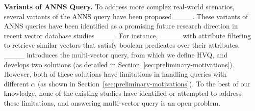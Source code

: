 
\noindent\textbf{Variants of ANNS Query.} To address more complex real-world scenarios, several variants of the ANNS query have been proposed____. These variants of ANNS queries have been identified as a promising future research direction in recent vector database studies____. For instance, ____  with attribute filtering to retrieve similar vectors that satisfy boolean predicates over their attributes. ____ introduces the multi-vector query, from which we define HVQ, and develops two solutions (as detailed in Section~\ref{sec:preliminary-motivations}). %
However, both of these solutions have limitations in handling queries with different $\alpha$ (as shown in Section~\ref{sec:preliminary-motivations}). 
To the best of our knowledge, none of the existing studies have identified or attempted to address these limitations, and answering multi-vector query is an open problem. 







